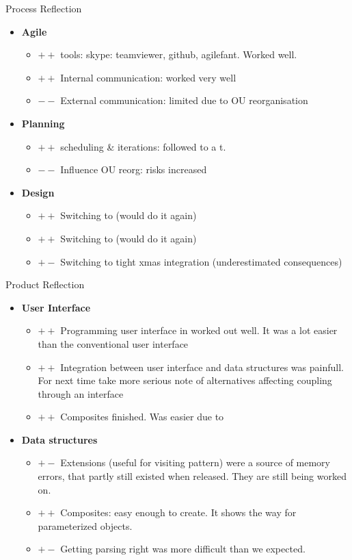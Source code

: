 \documentclass[11pt]{beamer}
\begin{document}
\begin{frame}{Process Reflection}
	\begin{itemize}
		\item {\bf Agile} 
				\begin{itemize}
					\item $++$ tools: skype: teamviewer, github, agilefant. Worked well.
					\item $++$ Internal communication: worked very well
					\item $--$ External communication: limited due to OU reorganisation
				\end{itemize}
		\item {\bf Planning}
				\begin{itemize}
					\item $++$ scheduling \& iterations: followed to a t.
					\item $--$ Influence OU reorg: risks increased
				\end{itemize}
		\item {\bf Design} 
			\begin{itemize}
				\item $++$ Switching to \qt				 (would do it again)
				\item $++$ Switching to \qml				 (would do it again)
				\item $+-$ Switching to tight xmas integration (underestimated consequences)
			\end{itemize}
	\end{itemize}
\end{frame}

\begin{frame}{Product Reflection}
	\begin{itemize}
		\item {\bf User Interface} 
				\begin{itemize}
					\item $++$ Programming user interface in \qml worked out well.
							It was a lot easier than the conventional user interface
					\item $++$ Integration between user interface and data structures
							was painfull. For next time take more serious note
							of alternatives affecting coupling through an interface
					\item $++$ Composites finished. Was easier due to \qml
				\end{itemize}
		\item {\bf Data structures}
				\begin{itemize}
					\item $+-$ Extensions (useful for visiting pattern) were a source
							of memory errors, that partly still existed when
							released. They are still being worked on.
					\item $++$ Composites: easy enough to create. It shows the way
							for parameterized objects.
					\item $+-$ Getting parsing right was more difficult than we expected.
				\end{itemize}
	\end{itemize}
\end{frame}
\end{document}

